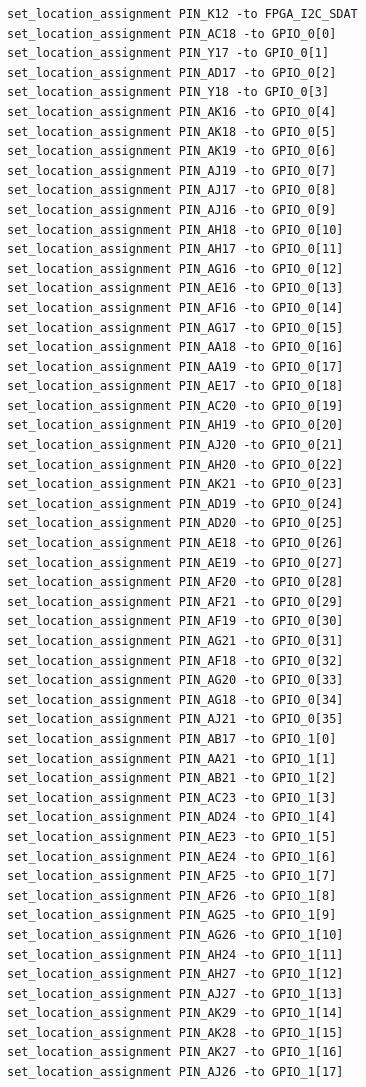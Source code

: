 \documentclass[conference]{IEEEtran}
\begin{document}
\begin{lstlisting}
set_location_assignment PIN_K12 -to FPGA_I2C_SDAT
set_location_assignment PIN_AC18 -to GPIO_0[0]
set_location_assignment PIN_Y17 -to GPIO_0[1]
set_location_assignment PIN_AD17 -to GPIO_0[2]
set_location_assignment PIN_Y18 -to GPIO_0[3]
set_location_assignment PIN_AK16 -to GPIO_0[4]
set_location_assignment PIN_AK18 -to GPIO_0[5]
set_location_assignment PIN_AK19 -to GPIO_0[6]
set_location_assignment PIN_AJ19 -to GPIO_0[7]
set_location_assignment PIN_AJ17 -to GPIO_0[8]
set_location_assignment PIN_AJ16 -to GPIO_0[9]
set_location_assignment PIN_AH18 -to GPIO_0[10]
set_location_assignment PIN_AH17 -to GPIO_0[11]
set_location_assignment PIN_AG16 -to GPIO_0[12]
set_location_assignment PIN_AE16 -to GPIO_0[13]
set_location_assignment PIN_AF16 -to GPIO_0[14]
set_location_assignment PIN_AG17 -to GPIO_0[15]
set_location_assignment PIN_AA18 -to GPIO_0[16]
set_location_assignment PIN_AA19 -to GPIO_0[17]
set_location_assignment PIN_AE17 -to GPIO_0[18]
set_location_assignment PIN_AC20 -to GPIO_0[19]
set_location_assignment PIN_AH19 -to GPIO_0[20]
set_location_assignment PIN_AJ20 -to GPIO_0[21]
set_location_assignment PIN_AH20 -to GPIO_0[22]
set_location_assignment PIN_AK21 -to GPIO_0[23]
set_location_assignment PIN_AD19 -to GPIO_0[24]
set_location_assignment PIN_AD20 -to GPIO_0[25]
set_location_assignment PIN_AE18 -to GPIO_0[26]
set_location_assignment PIN_AE19 -to GPIO_0[27]
set_location_assignment PIN_AF20 -to GPIO_0[28]
set_location_assignment PIN_AF21 -to GPIO_0[29]
set_location_assignment PIN_AF19 -to GPIO_0[30]
set_location_assignment PIN_AG21 -to GPIO_0[31]
set_location_assignment PIN_AF18 -to GPIO_0[32]
set_location_assignment PIN_AG20 -to GPIO_0[33]
set_location_assignment PIN_AG18 -to GPIO_0[34]
set_location_assignment PIN_AJ21 -to GPIO_0[35]
set_location_assignment PIN_AB17 -to GPIO_1[0]
set_location_assignment PIN_AA21 -to GPIO_1[1]
set_location_assignment PIN_AB21 -to GPIO_1[2]
set_location_assignment PIN_AC23 -to GPIO_1[3]
set_location_assignment PIN_AD24 -to GPIO_1[4]
set_location_assignment PIN_AE23 -to GPIO_1[5]
set_location_assignment PIN_AE24 -to GPIO_1[6]
set_location_assignment PIN_AF25 -to GPIO_1[7]
set_location_assignment PIN_AF26 -to GPIO_1[8]
set_location_assignment PIN_AG25 -to GPIO_1[9]
set_location_assignment PIN_AG26 -to GPIO_1[10]
set_location_assignment PIN_AH24 -to GPIO_1[11]
set_location_assignment PIN_AH27 -to GPIO_1[12]
set_location_assignment PIN_AJ27 -to GPIO_1[13]
set_location_assignment PIN_AK29 -to GPIO_1[14]
set_location_assignment PIN_AK28 -to GPIO_1[15]
set_location_assignment PIN_AK27 -to GPIO_1[16]
set_location_assignment PIN_AJ26 -to GPIO_1[17]

\end{lstlisting}
\end{document}
